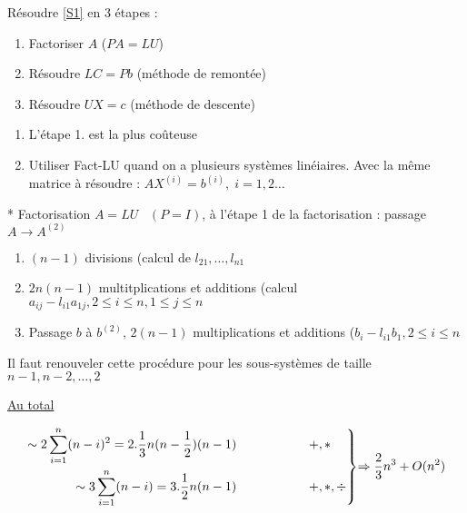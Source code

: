 \documentclass[a4paper,11pt]{article}
\newenvironment{rcases}
  {\left.\begin{aligned}}
  {\end{aligned}\right\rbrace}
\theoremstyle{plain} %
\begin{document}
Résoudre \ref{S1} en 3 étapes :
\begin{enumerate}
    \item Factoriser $A$ ($PA = LU$)
    \item Résoudre $LC = Pb$ (méthode de remontée)
    \item Résoudre $UX = c$ (méthode de descente)
\end{enumerate}

\vspace{1cm}
\begin{remark}
    \begin{enumerate}
        \item L'étape 1. est la plus coûteuse
        \item Utiliser Fact-LU quand on a plusieurs systèmes linéiaires. Avec la même matrice à résoudre : $AX^{(i)}=b^{(i)}, \; i = 1,2 \dots$
    \end{enumerate}
\end{remark}

\vspace{1cm}

* Factorisation $A=LU \; \; \; (P=I)$, à l'étape 1 de la factorisation : passage $A \to A^{(2)}$

\begin{enumerate}
    \item $(n-1)$ divisions (calcul de $l_{21}, \dots, l_{n1}$
    \item $2n(n-1)$ multitplications et additions (calcul $a_{ij}-l_{i1}a_{1j}, 2 \leq i \leq n, 1 \leq j \leq n$
    \item Passage $b$ à $b^{(2)}$, $2(n-1)$ multiplications et additions ($b_i - l_{i1}b_{1}, 2 \leq i \leq n$
\end{enumerate}

Il faut renouveler cette procédure pour les sous-systèmes de taille $n-1,n-2,\dots,2$

\underline{Au total}

\begin{equation*}
    \begin{rcases}
        \sim 2 \sum_{i=1}^n (n-i)^2 = 2.\frac{1}{3}n (n-\frac{1}{2})(n-1) \hspace{2cm}& +, *\\
        \sim 3 \sum_{i=1}^n (n-i) = 3.\frac{1}{2}n(n-1) \hspace{2cm} & +,*,\div
    \end{rcases}
    \text{$\Rightarrow \frac{2}{3}n^3+O(n^2)$}
\end{equation*}
\end{document}

